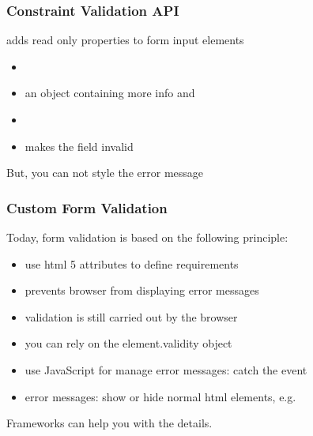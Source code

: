 \begin{frame}[fragile] \frametitle{Constraint Validation API}
adds read only properties to form input elements
\begin{itemize}
  \item {}
  \item {} an object containing more info  and 
  \item {}
  \item {} makes the field invalid
\end{itemize}
\vspace{5mm}
But, you can not style the error message
\end{frame}

\begin{frame}[fragile] \frametitle{Custom Form Validation}
Today, form validation is based on the following principle:
\begin{itemize}
  \item use html 5 attributes to define requirements
  \item {} prevents browser from displaying error messages
  \item validation is still carried out by the browser
  \item you can rely on the element.validity object
  \item use JavaScript for manage error messages: catch the  event
  \item error messages: show or hide normal html elements, e.g. 
\end{itemize}
\vspace{5mm}
Frameworks can help you with the details.
\end{frame}

